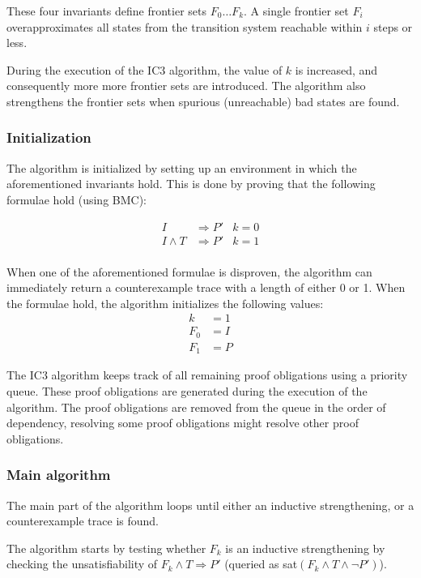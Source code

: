 \documentclass[a4paper]{article}
\begin{document}
These four invariants define frontier sets $F_0 \ldots F_k$. A single frontier set $F_i$ overapproximates all states from the transition system reachable within $i$ steps or less.

During the execution of the IC3 algorithm, the value of $k$ is increased, and consequently more more frontier sets are introduced. The algorithm also strengthens the frontier sets when spurious (unreachable) bad states are found.

\subsubsection{Initialization}
The algorithm is initialized by setting up an environment in which the aforementioned invariants hold. This is done by proving that the following formulae hold (using BMC):

\begin{align*}
I&\Rightarrow P' & k=0\\
I \land T &\Rightarrow P' & k=1\\
\end{align*}

\newpage
When one of the aforementioned formulae is disproven, the algorithm can immediately return a counterexample trace with a length of either 0 or 1. When the formulae hold, the algorithm initializes the following values:
\begin{align*}
k &= 1\\
F_0 &= I\\
F_1 &= P
\end{align*}

The IC3 algorithm keeps track of all remaining proof obligations using a priority queue. These proof obligations are generated during the execution of the algorithm. The proof obligations are removed from the queue in the order of dependency, resolving some proof obligations might resolve other proof obligations.

\subsubsection{Main algorithm}
The main part of the algorithm loops until either an inductive strengthening, or a counterexample trace is found.

The algorithm starts by testing whether $F_k$ is an inductive strengthening by checking the unsatisfiability of $F_k \land T \Rightarrow P'$ (queried as sat$(F_k \land T \land \lnot P')$).
\end{document}
